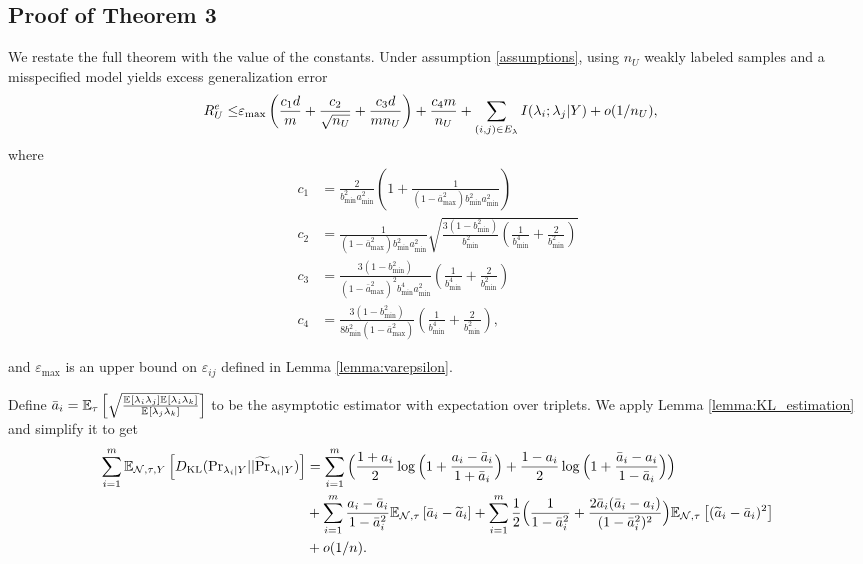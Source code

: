 \subsection{Proof of Theorem 3} 

We restate the full theorem with the value of the constants. Under assumption \ref{assumptions}, using $n_U$ weakly labeled samples and a misspecified model yields excess generalization error
\begin{align}
    R_U^{e} \le  & \varepsilon_{\max} \left(\frac{c_1 d}{m} + \frac{c_2}{\sqrt{n_U}} + \frac{c_3 d}{m n_U}\right) +\frac{c_4 m}{n_U} + \sum_{(i, j) \in E_{\lambda}}I(\lambda_i; \lambda_j | Y) + o(1/n_U), \nonumber
\end{align}
where 
\begin{align*}
    c_1 &=  \frac{2}{b_{\min}^2 a_{\min}^2} \left(1 + \frac{1}{(1 - \bar{a}_{\max}^2) b_{\min}^2 a_{\min}^2} \right) \\
    c_2 &= \frac{1}{(1 - \bar{a}_{\max}^2) b_{\min}^2 a_{\min}^2} \sqrt{\frac{3(1 - b_{\min}^2)}{b_{\min}^2} \left(\frac{1}{b_{\min}^4} + \frac{2}{b_{\min}^2} \right)} \\
    c_3 &= \frac{3(1 - b_{\min}^2)}{(1 - \bar{a}_{\max}^2)^2 b_{\min}^4 a_{\min}^2} \left(\frac{1}{b_{\min}^4} + \frac{2}{b_{\min}^2} \right) \\
    c_4 &= \frac{3(1 - b_{\min}^2)}{8b_{\min}^2 (1 - \bar{a}_{\max}^2)} \left(\frac{1}{b_{\min}^4} + \frac{2}{b_{\min}^2} \right),
\end{align*}

and $\varepsilon_{\max}$ is an upper bound on $\varepsilon_{ij}$ defined in Lemma \ref{lemma:varepsilon}.

Define $\bar{a}_i = \mathbb{E}_{\tau}\left[\sqrt{\frac{\mathbb{E}_{}\left[\lambda_i \lambda_j\right] \mathbb{E}_{}\left[\lambda_i \lambda_k\right]}{\mathbb{E}_{}\left[\lambda_j \lambda_k\right]}}\right]$ to be the asymptotic estimator with expectation over triplets. We apply Lemma \ref{lemma:KL_estimation} and simplify it to get
\begin{align}
    \sum_{i = 1}^m \mathbb{E}_{\mathcal{N}, \tau, Y}\left[D_{\mathrm{KL}} (\mathrm{Pr}_{\lambda_i | Y} || \widetilde{\Pr}_{\lambda_i | Y} )\right] &= \sum_{i = 1}^m \Big(\frac{1 + a_i}{2} \log \Big(1 + \frac{a_i - \bar{a}_i}{1 + \bar{a}_i}\Big) + \frac{1 - a_i}{2} \log \Big(1 + \frac{\bar{a}_i - a_i}{1 - \bar{a}_i} \Big)\Big)  \label{eq:acc_decomposition}\\
    &+ \sum_{i = 1}^m \frac{a_i - \bar{a}_i}{1 - \bar{a}_i^2} \mathbb{E}_{\mathcal{N}, \tau}\left[\bar{a}_i - \widetilde{a}_i \right] 
    + \sum_{i = 1}^m \frac{1}{2}\Big( \frac{1}{1 - \bar{a}_i^2} + \frac{2\bar{a}_i(\bar{a}_i - a_i)}{(1 - \bar{a}_i^2)^2}\Big) \mathbb{E}_{\mathcal{N}, \tau}\left[(\widetilde{a}_i - \bar{a}_i)^2\right] \nonumber \\
    &+ o(1/n).\nonumber 
\end{align}

